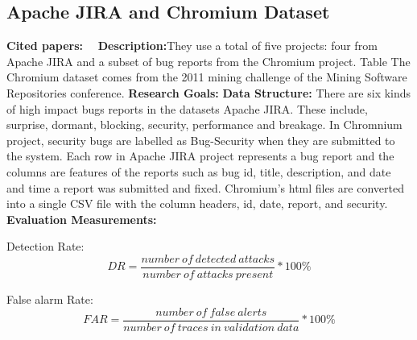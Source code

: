 \subsection{Apache JIRA and Chromium Dataset}
\textbf{Cited papers:}~\cite{peters2018text}~\cite{ohira2015dataset} \newline
\textbf{Description:}They use a total of five projects: four from Apache JIRA and a subset of bug reports from the Chromium project. Table The Chromium dataset comes from the 2011 mining challenge of the Mining Software Repositories conference. \newline
\textbf{Research Goals:}  \newline
\textbf{Data Structure:} There are six kinds of high impact bugs reports in
the datasets Apache JIRA. These include, surprise, dormant, blocking, security, performance and breakage. In Chromnium project, security bugs are labelled as Bug-Security when they are submitted to the system. Each row in Apache JIRA project represents a bug report and the columns are features of the reports such as bug id, title, description, and date and time a report was submitted and fixed. Chromium's html files are converted into a single CSV file with the
column headers, id, date, report, and security.\newline
\textbf{Evaluation Measurements:} \newline


Detection Rate:
\begin{equation}
    DR = \frac{number\:of\:detected\:attacks}{number\:of\:attacks\:present}*100\%
\end{equation}


False alarm Rate:
\begin{equation}
    FAR = \frac{number\:of\:false\:alerts}{number\:of\:traces\:in\:validation\:data}*100\%
\end{equation}
